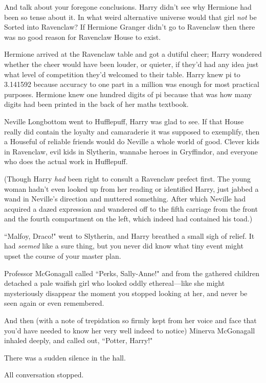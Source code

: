 And talk about your foregone conclusions. Harry didn't see why Hermione had been so tense about it. In what weird alternative universe would that girl \emph{not} be Sorted into Ravenclaw? If Hermione Granger didn't go to Ravenclaw then there was no good reason for Ravenclaw House to exist.

Hermione arrived at the Ravenclaw table and got a dutiful cheer; Harry wondered whether the cheer would have been louder, or quieter, if they'd had any idea just what level of competition they'd welcomed to their table. Harry knew pi to 3.141592 because accuracy to one part in a million was enough for most practical purposes. Hermione knew one hundred digits of pi because that was how many digits had been printed in the back of her maths textbook.

Neville Longbottom went to Hufflepuff, Harry was glad to see. If that House really did contain the loyalty and camaraderie it was supposed to exemplify, then a Houseful of reliable friends would do Neville a whole world of good. Clever kids in Ravenclaw, evil kids in Slytherin, wannabe heroes in Gryffindor, and everyone who does the actual work in Hufflepuff.

(Though Harry \emph{had} been right to consult a Ravenclaw prefect first. The young woman hadn't even looked up from her reading or identified Harry, just jabbed a wand in Neville's direction and muttered something. After which Neville had acquired a dazed expression and wandered off to the fifth carriage from the front and the fourth compartment on the left, which indeed had contained his toad.)

``Malfoy, Draco!" went to Slytherin, and Harry breathed a small sigh of relief. It had \emph{seemed} like a sure thing, but you never did know what tiny event might upset the course of your master plan.

Professor McGonagall called ``Perks, Sally-Anne!" and from the gathered children detached a pale waifish girl who looked oddly ethereal—like she might mysteriously disappear the moment you stopped looking at her, and never be seen again or even remembered.

And then (with a note of trepidation so firmly kept from her voice and face that you'd have needed to know her very well indeed to notice) Minerva McGonagall inhaled deeply, and called out, ``Potter, Harry!"

There was a sudden silence in the hall.

All conversation stopped.

